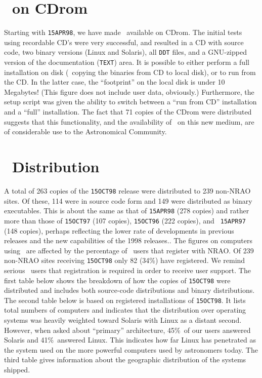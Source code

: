 \section{\AIPS\ on CDrom}

Starting with {\tt 15APR98}, we have made \AIPS\ available on CDrom.
The initial tests using recordable CD's were very successful, and
resulted in a CD with source code, two binary versions (Linux and
Solaris), all {\tt DDT} files, and a GNU-zipped version of the
documentation ({\tt TEXT}) area.  It is possible to either perform a
full installation on disk (\ie\ copying the binaries from CD to local
disk), or to run from the \hbox{CD}.  In the latter case, the
``footprint'' on the local disk is under 10 Megabytes!  (This figure
does not include user data, obviously.)  Furthermore, the setup script
was given the ability to switch between a ``run from CD'' installation
and a ``full'' installation.  The fact that 71 copies of the CDrom
were distributed suggests that this functionality, and the
availability of \AIPS\ on this new medium, are of considerable use to
the Astronomical Community.

\section{\AIPS\ Distribution}

A total of 263 copies of the {\tt 15OCT98} release were distributed to
239 non-NRAO sites.  Of these, 114 were in source code form and 149
were distributed as binary executables.  This is about the same as
that of {\tt 15APR98} (278 copies) and rather more than those of
{\tt 15OCT97} (107 copies), {\tt 15OCT96} (222 copies), and {\tt
15APR97} (148 copies), perhaps reflecting the lower rate of
developments in previous releases and the new capabilities of the
1998 releases.. The figures on computers using \AIPS\ are affected by
the percentage of \AIPS\ users that register with \hbox{NRAO}.  Of 239
non-NRAO sites receiving {\tt 15OCT98} only 82 (34\%) have registered.
We remind serious \AIPS\ users that registration is required in order
to receive user support.  The first table below shows the breakdown of
how the copies of {\tt 15OCT98} were distributed and includes both
source-code distributions and binary distributions.  The second table
below is based on registered installations of {\tt 15OCT98}.  It lists
total numbers of computers and indicates that the distribution over
operating systems was heavily weighted toward Solaris with Linux as a
distant second.  However, when asked about ``primary'' architecture,
45\%\ of our users answered Solaris and 41\%\ answered Linux.  This
indicates how far Linux has penetrated as the system used on the more
powerful computers used by astronomers today.  The third table gives
information about the geographic distribution of the systems shipped.

